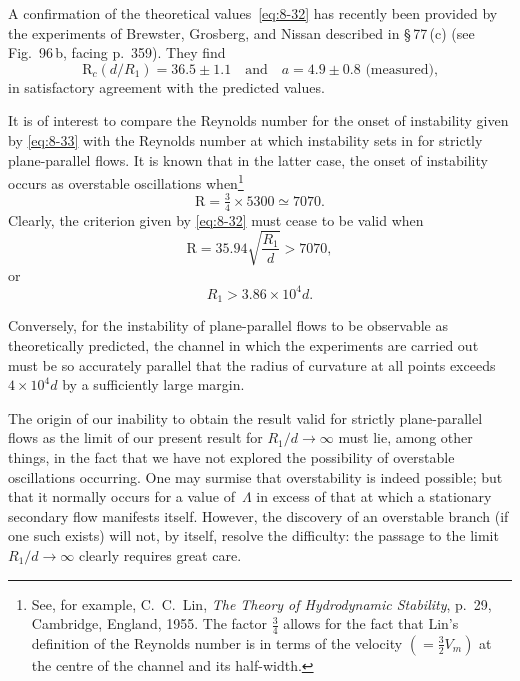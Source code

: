 A confirmation of the theoretical values~\eqref{eq:8-32} has recently been provided by the experiments of Brewster, Grosberg, and Nissan described in \S\,77\,(c) (see Fig.~96\,b, facing p.~359). They find
\begin{equation}
\label{eq:8-33}
\mathrm{R}_c(d/R_1) = 36.5 \pm 1.1 \quad \text{and} \quad a = 4.9 \pm 0.8 \text{ (measured),}
\end{equation}
in satisfactory agreement with the predicted values.


It is of interest to compare the Reynolds number for the onset of instability given by \eqref{eq:8-33} with the Reynolds number at which instability sets in for strictly plane-parallel flows. It is known that in the latter case, the onset of instability occurs as overstable oscillations when\footnote{See, for example, C.~C.~Lin, \emph{The Theory of Hydrodynamic Stability}, p.~29, Cambridge, England, 1955. The factor $\frac{3}{4}$ allows for the fact that Lin's definition of the Reynolds number is in terms of the velocity $(= \frac{3}{2}V_m)$ at the centre of the channel and its half-width.}
\begin{equation}
\label{eq:8-34}
\mathrm{R} = \tfrac{3}{4}\times 5300 \simeq 7070.
\end{equation}
Clearly, the criterion given by \eqref{eq:8-32} must cease to be valid when
\begin{equation}
\label{eq:8-34b}
\mathrm{R} = 35.94\sqrt{\frac{R_1}{d}} > 7070,
\end{equation}
or
\begin{equation}
\label{eq:8-35}
R_1 > 3.86 \times 10^4 d.
\end{equation}


Conversely, for the instability of plane-parallel flows to be observable as theoretically predicted, the channel in which the experiments are carried out must be so accurately parallel that the radius of curvature at all points exceeds $4\times 10^4 d$ by a sufficiently large margin.

The origin of our inability to obtain the result valid for strictly plane-parallel flows as the limit of our present result for $R_1/d \to \infty$ must lie, among other things, in the fact that we have not explored the possibility of overstable oscillations occurring. One may surmise that overstability is indeed possible; but that it normally occurs for a value of~$\Lambda$ in excess of that at which a stationary secondary flow manifests itself. However, the discovery of an overstable branch (if one such exists) will not, by itself, resolve the difficulty: the passage to the limit $R_1/d\to\infty$ clearly requires great care.

